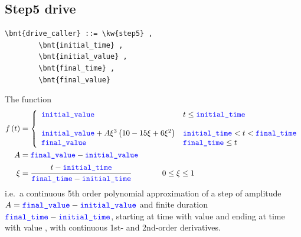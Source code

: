 \subsection{Step5 drive}
\begin{Verbatim}[commandchars=\\\{\}]
    \bnt{drive_caller} ::= \kw{step5} ,
        \bnt{initial_time} , 
        \bnt{initial_value} ,
        \bnt{final_time} ,
        \bnt{final_value}
\end{Verbatim}    
The function
\begin{align}
	f\plbr{t} &= 
	\lcubr{\matr{ll}{
		\nt{initial\_value} %
			& t \le \nt{initial\_time} \\
		\\
		\nt{initial\_value} + A \xi^3 \plbr{10 - 15 \xi + 6 \xi^2}
			& \nt{initial\_time} < t < \nt{final\_time}
		\\
		\nt{final\_value}
			& \nt{final\_time} \le t \\
	}}
	\\
	A &= \nt{final\_value} - \nt{initial\_value}
	\nonumber \\
	\xi &= \cfrac{t - \nt{initial\_time}}{\nt{final\_time} - \nt{initial\_time}}
	\hspace{40pt} 0 \le \xi \le 1
	\nonumber 
\end{align}
i.e.\ a continuous 5th order polynomial approximation of a step of amplitude $A = \textcolor{blue}{\texttt{final\_value}} - \textcolor{blue}{\texttt{initial\_value}}$
and finite duration $\textcolor{blue}{\texttt{final\_time}} - \textcolor{blue}{\texttt{initial\_time}}$,
starting at time  with value  and ending at time  with value ,
with continuous 1st- and 2nd-order derivatives.

